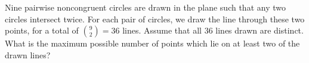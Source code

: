 Nine pairwise noncongruent circles are drawn in the plane such that any two circles intersect twice. For each pair of circles, we draw the line through these two points, for a total of $\binom 92 = 36$ lines. Assume that all $36$ lines drawn are distinct. What is the maximum possible number of points which lie on at least two of the drawn lines?
